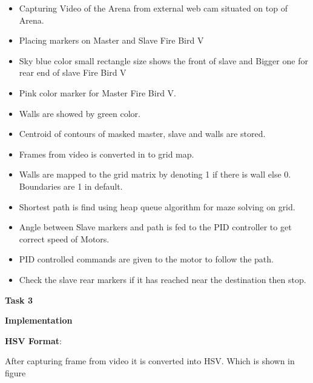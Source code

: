 \documentclass[report]{res}
\begin{document}
	\begin{itemize}
		\item	Capturing Video of the Arena from external web cam situated on top of Arena.
		\item	Placing markers on Master and Slave Fire Bird V
		\item	Sky blue color small rectangle size shows the front of slave and Bigger one for rear end of slave Fire Bird V
		\item	Pink color marker for Master Fire Bird V.
		\item	Walls are showed by green color.
		\item	Centroid of contours of masked master, slave and walls are stored.
		\item	Frames from video is converted in to grid map.
		\item	Walls are mapped to the grid matrix by denoting 1 if there is wall else 0. Boundaries are 1 in default.
		\item	Shortest path is find using heap queue algorithm for maze solving on grid.
		\item	Angle between Slave markers and path is fed to the PID controller to get correct speed of Motors.
		\item	PID controlled commands are given to the motor to follow the path.
		\item	Check the slave rear markers if it has reached near the destination then stop.
	\end{itemize}
	
	\pagebreak	
	
	\begin{center}
		\textbf{\Huge Task 3} \\
	\end{center}
	\begin{center}
		\textbf{\huge Implementation} \\
	\end{center}
	
	\textbf{HSV Format}:
	
	After capturing frame from video it is converted into HSV. Which is shown in figure
	
\end{document}
